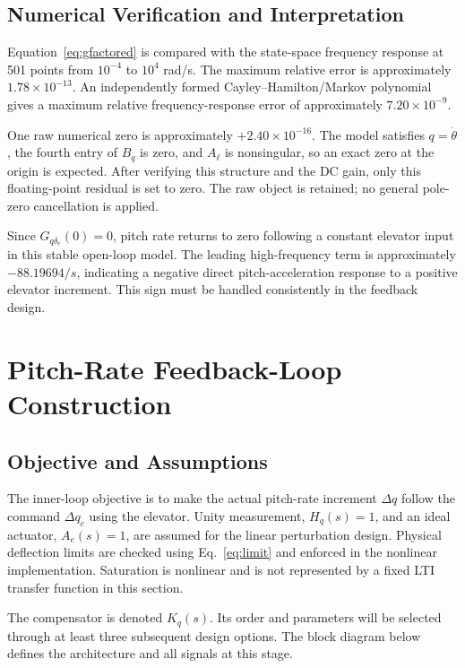 \documentclass[a4paper,11pt]{article}
\newcommand{\Gq}{G_{q\delta_e}}
\begin{document}
\subsection{Numerical Verification and Interpretation}
Equation~\eqref{eq:gfactored} is compared with the state-space frequency response at 501 points from $10^{-4}$ to $10^4$ rad/s. The maximum relative error is approximately $1.78\times10^{-13}$. An independently formed Cayley--Hamilton/Markov polynomial gives a maximum relative frequency-response error of approximately $7.20\times10^{-9}$.

One raw numerical zero is approximately $+2.40\times10^{-16}$. The model satisfies $q=\dot\theta$, the fourth entry of $B_q$ is zero, and $A_\ell$ is nonsingular, so an exact zero at the origin is expected. After verifying this structure and the DC gain, only this floating-point residual is set to zero. The raw object is retained; no general pole-zero cancellation is applied.

Since $\Gq(0)=0$, pitch rate returns to zero following a constant elevator input in this stable open-loop model. The leading high-frequency term is approximately $-88.19694/s$, indicating a negative direct pitch-acceleration response to a positive elevator increment. This sign must be handled consistently in the feedback design.

\section{Pitch-Rate Feedback-Loop Construction}\label{sec:loop}
\subsection{Objective and Assumptions}
The inner-loop objective is to make the actual pitch-rate increment $\Delta q$ follow the command $\Delta q_c$ using the elevator. Unity measurement, $H_q(s)=1$, and an ideal actuator, $A_e(s)=1$, are assumed for the linear perturbation design. Physical deflection limits are checked using Eq.~\eqref{eq:limit} and enforced in the nonlinear implementation. Saturation is nonlinear and is not represented by a fixed LTI transfer function in this section.

The compensator is denoted $K_q(s)$. Its order and parameters will be selected through at least three subsequent design options. The block diagram below defines the architecture and all signals at this stage.
\end{document}
